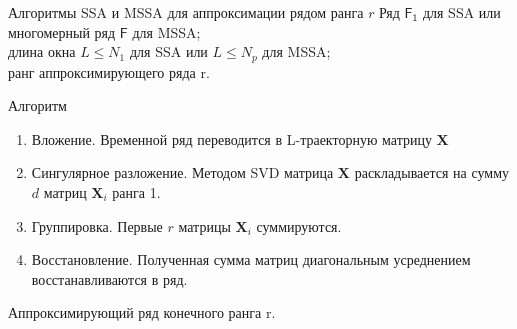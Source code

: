 \documentclass[ucs, notheorems, handout]{beamer}
\newcommand{\X}{\mathbf{X}}
\begin{document}
\begin{frame}{Алгоритмы SSA и MSSA для аппроксимации рядом ранга $r$}
    Ряд $\mathsf{F_1}$ для SSA или многомерный ряд $\mathsf{F}$ для MSSA;\\
    длина окна $L \leq N_1$ для SSA или $L \leq N_p$ для MSSA;\\
    ранг аппроксимирующего ряда r.\\
    
    \begin{block}{Алгоритм}
        \begin{enumerate}
            \item Вложение. Временной ряд переводится в L-траекторную матрицу $\X$
            \item Сингулярное разложение. Методом SVD матрица $\X$ раскладывается на сумму $d$ матриц $\X_i$ ранга 1.
            \item Группировка. Первые $r$ матрицы $\X_i$ суммируются.
            \item Восстановление. Полученная сумма матриц диагональным усреднением восстанавливаются в ряд.
        \end{enumerate}
        
    \end{block}
    
    Аппроксимирующий ряд конечного ранга r.

\end{frame}
\end{document}
